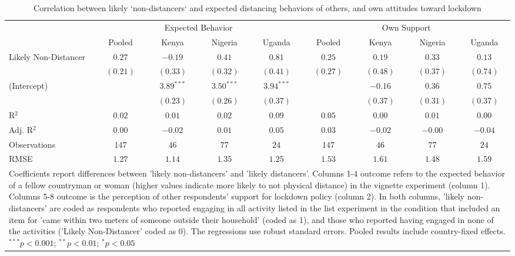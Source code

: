 
\begin{table}
\caption{Correlation between likely `non-distancers` and expected distancing behaviors of others, and own attitudes toward lockdown}
\begin{center}
\begin{tabular}{l c c c c c c c c}
\hline
 & \multicolumn{4}{c}{Expected Behavior} & \multicolumn{4}{c}{Own Support} \\
\cline{2-5} \cline{6-9}
 & Pooled & Kenya & Nigeria & Uganda & Pooled & Kenya & Nigeria & Uganda \\
\hline
Likely Non-Distancer & $0.27$   & $-0.19$      & $0.41$       & $0.81$       & $0.25$   & $0.19$   & $0.33$   & $0.13$   \\
                     & $(0.21)$ & $(0.33)$     & $(0.32)$     & $(0.41)$     & $(0.27)$ & $(0.48)$ & $(0.37)$ & $(0.74)$ \\
(Intercept)          &          & $3.89^{***}$ & $3.50^{***}$ & $3.94^{***}$ &          & $-0.16$  & $0.36$   & $0.75$   \\
                     &          & $(0.23)$     & $(0.26)$     & $(0.37)$     &          & $(0.37)$ & $(0.31)$ & $(0.37)$ \\
\hline
R$^2$                & $0.02$   & $0.01$       & $0.02$       & $0.09$       & $0.05$   & $0.00$   & $0.01$   & $0.00$   \\
Adj. R$^2$           & $0.00$   & $-0.02$      & $0.01$       & $0.05$       & $0.03$   & $-0.02$  & $-0.00$  & $-0.04$  \\
Observations         & $147$    & $46$         & $77$         & $24$         & $147$    & $46$     & $77$     & $24$     \\
RMSE                 & $1.27$   & $1.14$       & $1.35$       & $1.25$       & $1.53$   & $1.61$   & $1.48$   & $1.59$   \\
\hline
\multicolumn{9}{l}{\scriptsize{Coefficients report differences between 'likely non-distancers' and 'likely distancers'. Columns 1-4 outcome refers to the expected behavior of a fellow countryman or woman (higher values indicate more likely to not physical distance) in the vignette experiment (column 1). Columns 5-8 outcome is the perception of other respondents' support for lockdown policy (column 2). In both columns, 'likely non-distancers' are coded as respondents who reported engaging in all activity listed in the list experiment in the condition that included an item for 'came within two meters of someone outside their household' (coded as 1), and those who reported having engaged in none of the activities ('Likely Non-Distancer' coded as 0). The regressions use robust standard errors. Pooled results include country-fixed effects. $^{***}p<0.001$; $^{**}p<0.01$; $^{*}p<0.05$}}
\end{tabular}
\label{tab_distancers_belief}
\end{center}
\end{table}

